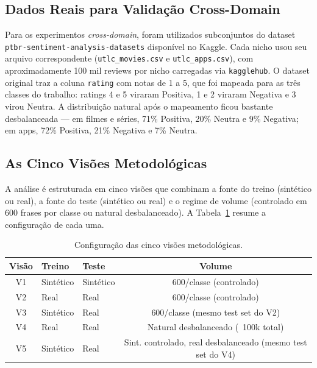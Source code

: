 \documentclass[12pt]{article}
\begin{document}
\subsection{Dados Reais para Validação Cross-Domain}

Para os experimentos \textit{cross-domain}, foram utilizados subconjuntos do dataset \texttt{ptbr-sentiment-analysis-datasets} \cite{souza2022brazilian} disponível no Kaggle. Cada nicho usou seu arquivo correspondente (\texttt{utlc\_movies.csv} e \texttt{utlc\_apps.csv}), com aproximadamente 100 mil reviews por nicho carregadas via \texttt{kagglehub}. O dataset original traz a coluna \texttt{rating} com notas de 1 a 5, que foi mapeada para as três classes do trabalho: ratings 4 e 5 viraram Positiva, 1 e 2 viraram Negativa e 3 virou Neutra. A distribuição natural após o mapeamento ficou bastante desbalanceada — em filmes e séries, 71\% Positiva, 20\% Neutra e 9\% Negativa; em apps, 72\% Positiva, 21\% Negativa e 7\% Neutra.

\subsection{As Cinco Visões Metodológicas}
\label{sec:visoes}

A análise é estruturada em cinco visões que combinam a fonte do treino (sintético ou real), a fonte do teste (sintético ou real) e o regime de volume (controlado em 600 frases por classe ou natural desbalanceado). A Tabela~\ref{tab:visoes} resume a configuração de cada uma.

\begin{table}[h]
\centering
\caption{Configuração das cinco visões metodológicas.}
\label{tab:visoes}
\small
\begin{tabular}{cllc}
\toprule
\textbf{Visão} & \textbf{Treino} & \textbf{Teste} & \textbf{Volume} \\
\midrule
V1 & Sintético & Sintético & 600/classe (controlado) \\
V2 & Real      & Real      & 600/classe (controlado) \\
V3 & Sintético & Real      & 600/classe (mesmo test set do V2) \\
V4 & Real      & Real      & Natural desbalanceado (~100k total) \\
V5 & Sintético & Real      & Sint. controlado, real desbalanceado (mesmo test set do V4) \\
\bottomrule
\end{tabular}
\end{table}
\end{document}

